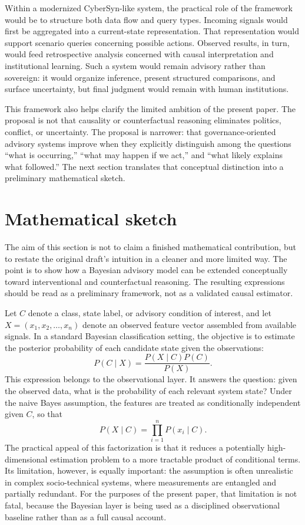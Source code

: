 \documentclass[11pt]{article}
\begin{document}
Within a modernized CyberSyn-like system, the practical role of the framework would be to structure both data flow and query types. Incoming signals would first be aggregated into a current-state representation. That representation would support scenario queries concerning possible actions. Observed results, in turn, would feed retrospective analysis concerned with causal interpretation and institutional learning. Such a system would remain advisory rather than sovereign: it would organize inference, present structured comparisons, and surface uncertainty, but final judgment would remain with human institutions.

This framework also helps clarify the limited ambition of the present paper. The proposal is not that causality or counterfactual reasoning eliminates politics, conflict, or uncertainty. The proposal is narrower: that governance-oriented advisory systems improve when they explicitly distinguish among the questions ``what is occurring,'' ``what may happen if we act,'' and ``what likely explains what followed.'' The next section translates that conceptual distinction into a preliminary mathematical sketch.

\section{Mathematical sketch}

The aim of this section is not to claim a finished mathematical contribution, but to restate the original draft's intuition in a cleaner and more limited way. The point is to show how a Bayesian advisory model can be extended conceptually toward interventional and counterfactual reasoning. The resulting expressions should be read as a preliminary framework, not as a validated causal estimator.

Let $C$ denote a class, state label, or advisory condition of interest, and let $X = (x_1, x_2, \ldots, x_n)$ denote an observed feature vector assembled from available signals. In a standard Bayesian classification setting, the objective is to estimate the posterior probability of each candidate state given the observations:
\begin{equation}
P(C \mid X) = \frac{P(X \mid C)P(C)}{P(X)}.
\end{equation}
This expression belongs to the observational layer. It answers the question: given the observed data, what is the probability of each relevant system state? Under the naive Bayes assumption, the features are treated as conditionally independent given $C$, so that
\begin{equation}
P(X \mid C) = \prod_{i=1}^{n} P(x_i \mid C).
\end{equation}
The practical appeal of this factorization is that it reduces a potentially high-dimensional estimation problem to a more tractable product of conditional terms. Its limitation, however, is equally important: the assumption is often unrealistic in complex socio-technical systems, where measurements are entangled and partially redundant. For the purposes of the present paper, that limitation is not fatal, because the Bayesian layer is being used as a disciplined observational baseline rather than as a full causal account.
\end{document}
